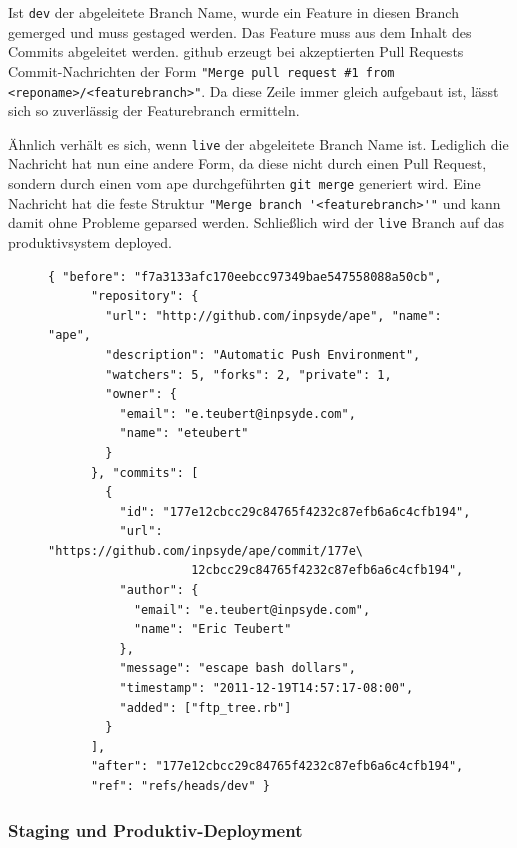 Ist \lstinline!dev! der abgeleitete Branch Name, wurde ein Feature in diesen Branch gemerged und muss gestaged werden. Das Feature muss aus dem Inhalt des Commits abgeleitet werden. \gls{github} erzeugt bei akzeptierten Pull Requests Commit-Nachrichten der Form \lstinline!"Merge pull request #1 from <reponame>/<featurebranch>"!. Da diese Zeile immer gleich aufgebaut ist, lässt sich so zuverlässig der Featurebranch ermitteln.

Ähnlich verhält es sich, wenn \lstinline!live! der abgeleitete Branch Name ist. Lediglich die Nachricht hat nun eine andere Form, da diese nicht durch einen Pull Request, sondern durch einen vom \gls{ape} durchgeführten \lstinline!git merge! generiert wird. Eine Nachricht hat die feste Struktur \lstinline!"Merge branch '<featurebranch>'"! und kann damit ohne Probleme geparsed werden. Schließlich wird der \lstinline!live! Branch auf das \gls{produktivsystem} deployed.

\begin{figure}
	\begin{lstlisting}[caption=Beispiel-Webhook von \gls{github},label={lst:example_payload}]
	{ "before": "f7a3133afc170eebcc97349bae547558088a50cb",
	  "repository": {
	    "url": "http://github.com/inpsyde/ape", "name": "ape",
	    "description": "Automatic Push Environment",
	    "watchers": 5, "forks": 2, "private": 1,
	    "owner": {
	      "email": "e.teubert@inpsyde.com",
	      "name": "eteubert"
	    }
	  }, "commits": [
	    {
	      "id": "177e12cbcc29c84765f4232c87efb6a6c4cfb194",
	      "url": "https://github.com/inpsyde/ape/commit/177e\
					12cbcc29c84765f4232c87efb6a6c4cfb194",
	      "author": {
	        "email": "e.teubert@inpsyde.com",
	        "name": "Eric Teubert"
	      },
	      "message": "escape bash dollars",
	      "timestamp": "2011-12-19T14:57:17-08:00",
	      "added": ["ftp_tree.rb"]
	    }
	  ],
	  "after": "177e12cbcc29c84765f4232c87efb6a6c4cfb194",
	  "ref": "refs/heads/dev" }
	\end{lstlisting}
	
\end{figure}



\subsubsection{Staging und Produktiv-Deployment} %
\label{ssub:staging_und_produktiv_deployment}

